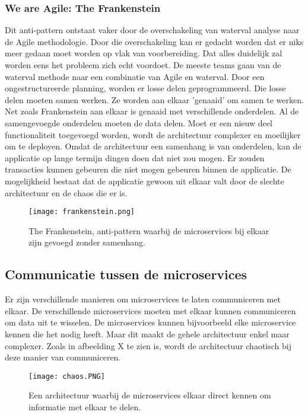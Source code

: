 \subsubsection{We are Agile: The Frankenstein}
Dit anti-pattern ontstaat vaker door de overschakeling van waterval analyse naar de Agile methodologie. Door die overschakeling kan er gedacht worden dat er niks meer gedaan moet worden op vlak van voorbereiding. Dat alles duidelijk zal worden eens het probleem zich echt voordoet. De meeste teams gaan van de waterval methode naar een combinatie van Agile en waterval. 
Door een ongestructureerde planning, worden er losse delen geprogrammeerd. Die losse delen moeten samen werken. Ze worden aan elkaar 'genaaid' om samen te werken. Net zoals Frankenstein aan elkaar is genaaid met verschillende onderdelen. Al de samengevoegde onderdelen moeten de data delen. Moet er een nieuw deel functionaliteit toegevoegd worden, wordt de architectuur complexer en moeilijker om te deployen. 
Omdat de architectuur een samenhang is van onderdelen, kan de applicatie op lange termijn dingen doen dat niet zou mogen. Er zouden transacties kunnen gebeuren die niet mogen gebeuren binnen de applicatie. De mogelijkheid bestaat dat de applicatie gewoon uit elkaar valt door de slechte architectuur en de chaos die er is. 
\begin{figure}[h!]
	\texttt{[image: frankenstein.png]}
	\centering
	\caption{The Frankenstein, anti-pattern waarbij de microservices bij elkaar zijn gevoegd zonder samenhang. \textcite{Monson2019}}
\end{figure}



\subsection{Communicatie tussen de microservices}
Er zijn verschillende manieren om microservices te laten communiceren met elkaar. De verschillende microservices moeten met elkaar kunnen communiceren om data uit te wisselen. De microservices kunnen bijvoorbeeld elke microservice kennen die het nodig heeft. Maar dit maakt de gehele architectuur enkel maar complexer. Zoals in afbeelding X te zien is, wordt de architectuur chaotisch bij deze manier van communiceren.
\begin{figure}[h!]
	\texttt{[image: chaos.PNG]}
	\centering
	\caption{Een architectuur waarbij de microservices elkaar direct kennen om informatie met elkaar te delen.}
\end{figure}

